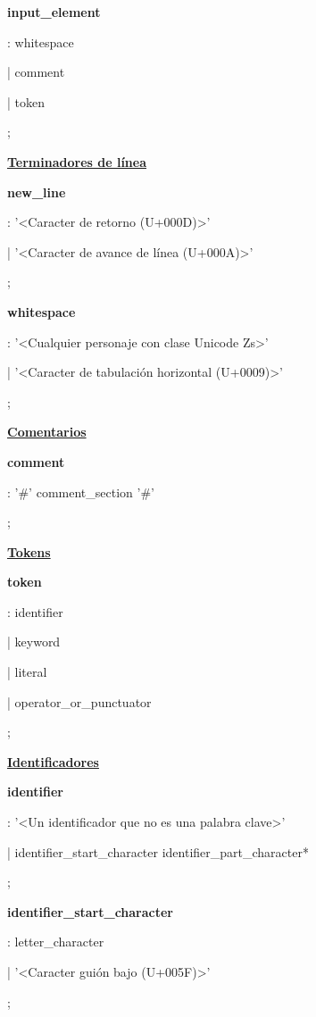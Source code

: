 		\textbf{input\_element}\par
		: whitespace\par
		| comment\par
		| token\par
		;\par
		
		\underline{\textbf{Terminadores de línea}}\par
		\textbf{new\_line}\par
		: '<Caracter de retorno (U+000D)>'\par
		| '<Caracter de avance de línea (U+000A)>'\par
		;\par
		
		\textbf{whitespace}\par
		: '<Cualquier personaje con clase Unicode Zs>'\par
		| '<Caracter de tabulación horizontal (U+0009)>'\par
		;\par
		
		\underline{\textbf{Comentarios}}\par
		\textbf{comment}\par
		: '\#' comment\_section '\#'\par
		;\par
		
		\underline{\textbf{Tokens}}\par
		\textbf{token}\par
		: identifier\par
		| keyword\par
		| literal\par
		| operator\_or\_punctuator\par
		;\par
		
		\underline{\textbf{Identificadores}}\par
		\textbf{identifier}\par
		: '<Un identificador que no es una palabra clave>'\par
		| identifier\_start\_character identifier\_part\_character*\par
		;\par
		
		\textbf{identifier\_start\_character}\par
		: letter\_character\par
		| '<Caracter guión bajo (U+005F)>'\par
		;\par
		
